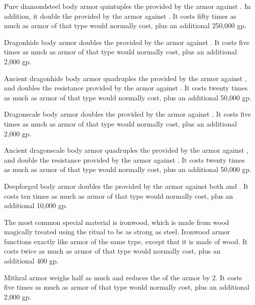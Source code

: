         Pure diamondsteel body armor quintuples the  provided by the armor against .
        In addition, it double the  provided by the armor against .
        It costs fifty times as much as armor of that type would normally cost, plus an additional 250,000 gp.

         Dragonhide body armor doubles the  provided by the armor against .
        It costs five times as much as armor of that type would normally cost, plus an additional 2,000 gp.

         Ancient dragonhide body armor quadruples the  provided by the armor against , and doubles the resistance provided by the armor against .
        It costs twenty times as much as armor of that type would normally cost, plus an additional 50,000 gp.

         Dragonscale body armor doubles the  provided by the armor against .
        It costs five times as much as armor of that type would normally cost, plus an additional 2,000 gp.

         Ancient dragonscale body armor quadruples the  provided by the armor against , and double the resistance provided by the armor against .
        It costs twenty times as much as armor of that type would normally cost, plus an additional 50,000 gp.

         Deepforged body armor doubles the  provided by the armor against both  and .
        It costs ten times as much as armor of that type would normally cost, plus an additional 10,000 gp.

         The most common special material is ironwood, which is made from wood magically treated using the  ritual to be as strong as steel. Ironwood armor functions exactly like  armor of the same type, except that it is made of wood.
        It costs twice as much as armor of that type would normally cost, plus an additional 400 gp.

         Mithral armor weighs half as much and reduces the  of the armor by 2.
        It costs five times as much as armor of that type would normally cost, plus an additional 2,000 gp.

